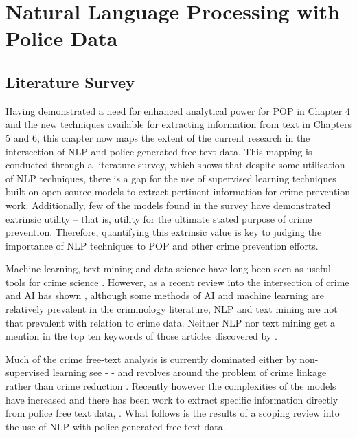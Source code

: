 \chapter{ Natural Language Processing with Police Data}

\section{Literature Survey}

Having demonstrated a need for enhanced analytical power for POP in Chapter 4 and the new techniques available for extracting information from text in Chapters 5 and 6, this chapter now maps the extent of the current research in the intersection of NLP and police generated free text data. This mapping is conducted through a literature survey, which shows that despite some utilisation of NLP techniques, there is a gap for the use of supervised learning techniques built on open-source models to extract pertinent information for crime prevention work. Additionally, few of the models found in the survey have demonstrated extrinsic utility – that is, utility for the ultimate stated purpose of crime prevention. Therefore, quantifying this extrinsic value is key to judging the importance of NLP techniques to POP and other crime prevention efforts.

Machine learning, text mining and data science have long been seen as useful tools for crime science  \parencite{marshall2006needles}. However, as a recent review into the intersection of crime and AI has shown \parencite{campedelli2019we}, although some methods of AI and machine learning are relatively prevalent in the criminology literature, NLP and text mining are not that prevalent with relation to crime data. Neither NLP nor text mining get a mention in the top ten keywords of those articles discovered by \textcite{campedelli2019we}. 

Much of the crime free-text analysis is currently dominated either by non-supervised learning see -  \parencite{kuang2017crime, seo2018partially, birks2020unsupervised} - and revolves around the problem of crime linkage rather than crime reduction \parencite{hassani2016review}. Recently however the complexities of the models have increased and there has been work to extract specific information directly from police free text data, \parencite{karystianis2018automatic, karystianis2019automated}.  What follows is the results of a scoping review \parencite{arksey2005scoping} into the use of NLP with police generated free text data. 

